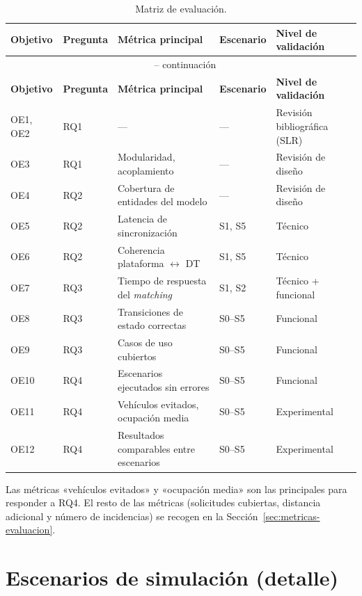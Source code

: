 \setlength{\tabcolsep}{4pt}
\begin{longtable}{@{}p{1.8cm} p{1.8cm} p{4.2cm} p{1.8cm} p{4.8cm}@{}}
  \caption{Matriz de evaluación.}
  \label{tab:matriz-evaluacion}\\
  \hline
  \textbf{Objetivo} & \textbf{Pregunta} & \textbf{Métrica principal} & \textbf{Escenario} & \textbf{Nivel de validación} \\
  \hline
  \endfirsthead
  \multicolumn{5}{c}{\tablename\ \thetable{} -- continuación}\\
  \hline
  \textbf{Objetivo} & \textbf{Pregunta} & \textbf{Métrica principal} & \textbf{Escenario} & \textbf{Nivel de validación} \\
  \hline
  \endhead
  OE1, OE2 & RQ1 & --- & --- & Revisión bibliográfica (SLR) \\
  OE3 & RQ1 & Modularidad, acoplamiento & --- & Revisión de diseño \\
  OE4 & RQ2 & Cobertura de entidades del modelo & --- & Revisión de diseño \\
  OE5 & RQ2 & Latencia de sincronización & S1, S5 & Técnico \\
  OE6 & RQ2 & Coherencia plataforma $\leftrightarrow$ DT & S1, S5 & Técnico \\
  OE7 & RQ3 & Tiempo de respuesta del \textit{matching} & S1, S2 & Técnico + funcional \\
  OE8 & RQ3 & Transiciones de estado correctas & S0--S5 & Funcional \\
  OE9 & RQ3 & Casos de uso cubiertos & S0--S5 & Funcional \\
  OE10 & RQ4 & Escenarios ejecutados sin errores & S0--S5 & Funcional \\
  OE11 & RQ4 & Vehículos evitados, ocupación media & S0--S5 & Experimental \\
  OE12 & RQ4 & Resultados comparables entre escenarios & S0--S5 & Experimental \\
  \hline
\end{longtable}
\setlength{\tabcolsep}{6pt}

Las métricas «vehículos evitados» y «ocupación media» son las principales para responder a RQ4. El resto de las métricas (solicitudes cubiertas, distancia adicional y número de incidencias) se recogen en la Sección~\ref{sec:metricas-evaluacion}.

\chapter{Escenarios de simulación (detalle)}
\label{anx:escenarios-detalle}

